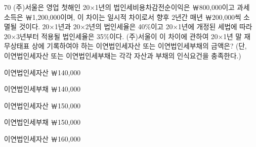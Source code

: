 \begin{question}{70}
(주)서울은 영업 첫해인 20×1년의 법인세비용차감전순이익은 ￦800,000이고 과세소득은 ￦1,200,000이며, 이 차이는 일시적 차이로서 향후 2년간 매년 ￦200,000씩 소멸될 것이다. 20×1년과 20×2년의 법인세율은 40\%이고 20×1년에 개정된 세법에 따라 20×3년부터 적용될 법인세율은 35\%이다. (주)서울이 이 차이에 관하여 20×1년 말 재무상태표 상에 기록하여야 하는 이연법인세자산 또는 이연법인세부채의 금액은? (단, 이연법인세자산 또는 이연법인세부채는 각각 자산과 부채의 인식요건을 충족한다.)
\begin{choices}
  \item 이연법인세자산 ￦140,000
  \item 이연법인세부채 ￦140,000
  \item 이연법인세자산 ￦150,000
  \item 이연법인세부채 ￦150,000
  \item 이연법인세자산 ￦160,000
\end{choices}
\end{question}
